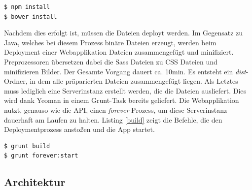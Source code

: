 \vspace{1cm}
\begin{lstlisting}[caption=Installation der Zusatzbibliotheken für die Webapplikation,label=installDependencies]
$ npm install
$ bower install
\end{lstlisting}
\vspace{0.5cm}

Nachdem dies erfolgt ist, müssen die Dateien deployt werden. Im Gegensatz zu Java, welches bei diesem Prozess binäre Dateien erzeugt, werden beim Deployment einer Webapplikation Dateien zusammengefügt und minifiziert. Preprozessoren übersetzen dabei die Sass Dateien zu CSS Dateien und minifizieren Bilder. Der Gesamte Vorgang dauert ca. 10min. Es entsteht ein \textit{dist}-Ordner, in dem alle präparierten Dateien zusammengefügt liegen. Als Letztes muss lediglich eine Serverinstanz erstellt werden, die die Dateien ausliefert. Dies wird dank Yeoman in einem Grunt-Task bereits geliefert. Die Webapplikation nutzt, genauso wie die API, einen \textit{forever}-Prozess, um diese Serverinstanz dauerhaft am Laufen zu halten. Listing \ref{build} zeigt die Befehle, die den Deploymentprozess anstoßen und die App startet.

\vspace{1cm}
\begin{lstlisting}[caption=Deployment und Start der Webapplikation,label=build]
$ grunt build
$ grunt forever:start
\end{lstlisting}
\vspace{0.5cm}


\subsection{Architektur}

